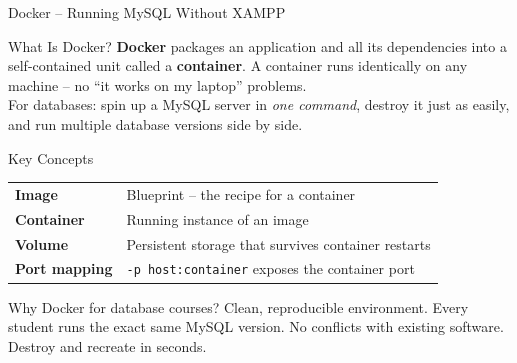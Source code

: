 \begin{frame}{Docker -- Running MySQL Without XAMPP}
  \begin{block}{What Is Docker?}
    \textbf{Docker} packages an application and all its dependencies into a
    self-contained unit called a \textbf{container}. A container runs identically
    on any machine -- no ``it works on my laptop'' problems.\\[0.3em]
    For databases: spin up a MySQL server in \emph{one command}, destroy it just
    as easily, and run multiple database versions side by side.
  \end{block}

  \begin{block}{Key Concepts}
    \begin{tabular}{@{}ll@{}}
      \textbf{Image}   & Blueprint -- the recipe for a container \\
      \textbf{Container} & Running instance of an image \\
      \textbf{Volume}  & Persistent storage that survives container restarts \\
      \textbf{Port mapping} & \texttt{-p host:container} exposes the container port \\
    \end{tabular}
  \end{block}

  \begin{alertblock}{Why Docker for database courses?}
    Clean, reproducible environment. Every student runs the exact same MySQL
    version. No conflicts with existing software. Destroy and recreate in seconds.
  \end{alertblock}
\end{frame}

